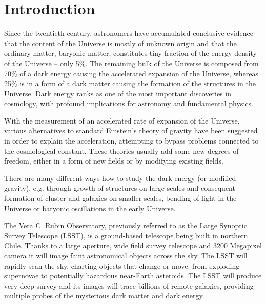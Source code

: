 \chapter*{Introduction}

Since the twentieth century, astronomers have accumulated conclusive evidence that the content of the Universe is mostly of unknown origin and that the ordinary matter, baryonic matter, constitutes tiny fraction of the energy-density of the Universe -- only 5\%. The remaining bulk of the Universe is composed from 70\% of a dark energy causing the accelerated expansion of the Universe, whereas 25\% is in a form of a dark matter causing the formation of the structures in the Universe. Dark energy ranks as one of the most important discoveries in cosmology, with profound implications for astronomy and fundamental physics.

With the measurement of an accelerated rate of expansion of the Universe, various alternatives to standard Einstein's theory of gravity have been suggested in order to explain the acceleration, attempting to bypass problems connected to the cosmological constant. These theories usually add some new degrees of freedom, either in a form of new fields or by modifying existing fields.

There are many different ways how to study the dark energy (or modified gravity), e.g. through growth of structures on large scales and consequent formation of cluster and galaxies on smaller scales, bending of light in the Universe or baryonic oscillations in the early Universe.




The Vera C. Rubin Observatory, previously referred to as the Large Synoptic Survey Telescope (LSST), is a ground-based telescope being built in northern Chile. Thanks to a large aperture, wide field survey telescope and 3200 Megapixel camera it will image faint astronomical objects across the sky. The LSST will rapidly scan the sky, charting objects that change or move: from exploding supernovae to potentially hazardous near-Earth asteroids. The LSST will produce very deep survey and its images will trace billions of remote galaxies, providing multiple probes of the mysterious dark matter and dark energy.

